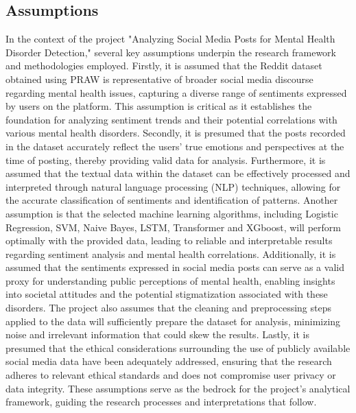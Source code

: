 \subsection{Assumptions}
\noindent
In the context of the project "Analyzing Social Media Posts for Mental Health Disorder Detection," several key assumptions underpin the research framework and methodologies employed. Firstly, it is assumed that the Reddit dataset obtained using PRAW is representative of broader social media discourse regarding mental health issues, capturing a diverse range of sentiments expressed by users on the platform. This assumption is critical as it establishes the foundation for analyzing sentiment trends and their potential correlations with various mental health disorders. Secondly, it is presumed that the posts recorded in the dataset accurately reflect the users' true emotions and perspectives at the time of posting, thereby providing valid data for analysis. Furthermore, it is assumed that the textual data within the dataset can be effectively processed and interpreted through natural language processing (NLP) techniques, allowing for the accurate classification of sentiments and identification of patterns. Another assumption is that the selected machine learning algorithms, including Logistic Regression, SVM, Naive Bayes, LSTM, Transformer and XGboost, will perform optimally with the provided data, leading to reliable and interpretable results regarding sentiment analysis and mental health correlations. Additionally, it is assumed that the sentiments expressed in social media posts can serve as a valid proxy for understanding public perceptions of mental health, enabling insights into societal attitudes and the potential stigmatization associated with these disorders. The project also assumes that the cleaning and preprocessing steps applied to the data will sufficiently prepare the dataset for analysis, minimizing noise and irrelevant information that could skew the results. Lastly, it is presumed that the ethical considerations surrounding the use of publicly available social media data have been adequately addressed, ensuring that the research adheres to relevant ethical standards and does not compromise user privacy or data integrity. These assumptions serve as the bedrock for the project's analytical framework, guiding the research processes and interpretations that follow.

